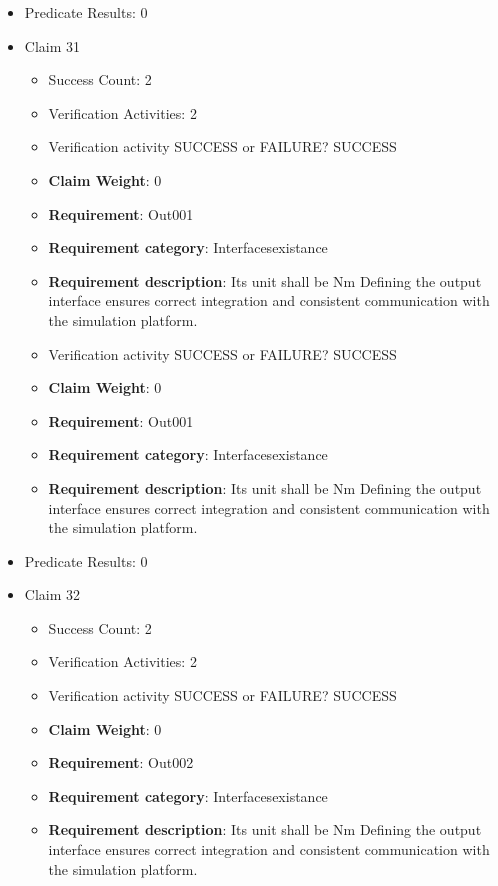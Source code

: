 \documentclass{article}
\begin{document}
\begin{itemize}
									    
				\item Predicate Results: 0

  				  \item Claim 31
				\begin{itemize}
			    	\item Success Count: 2 
			    	\item Verification Activities: 2
					\item Verification activity SUCCESS or FAILURE? SUCCESS
					\item \textbf{Claim Weight}: 0
						\item \textbf{Requirement}: Out001 
						\item \textbf{Requirement category}: Interfacesexistance 
						\item \textbf{Requirement description}: Its unit shall be Nm Defining the output interface ensures correct integration and consistent communication with the simulation platform.
					
					\item Verification activity SUCCESS or FAILURE? SUCCESS
					\item \textbf{Claim Weight}: 0
						\item \textbf{Requirement}: Out001 
						\item \textbf{Requirement category}: Interfacesexistance 
						\item \textbf{Requirement description}: Its unit shall be Nm Defining the output interface ensures correct integration and consistent communication with the simulation platform.
					
				\end{itemize}
				
									    
				\item Predicate Results: 0

  				  \item Claim 32
				\begin{itemize}
			    	\item Success Count: 2 
			    	\item Verification Activities: 2
					\item Verification activity SUCCESS or FAILURE? SUCCESS
					\item \textbf{Claim Weight}: 0
						\item \textbf{Requirement}: Out002 
						\item \textbf{Requirement category}: Interfacesexistance 
						\item \textbf{Requirement description}: Its unit shall be Nm Defining the output interface ensures correct integration and consistent communication with the simulation platform.
					

\end{itemize}
\end{itemize}
\end{document}
